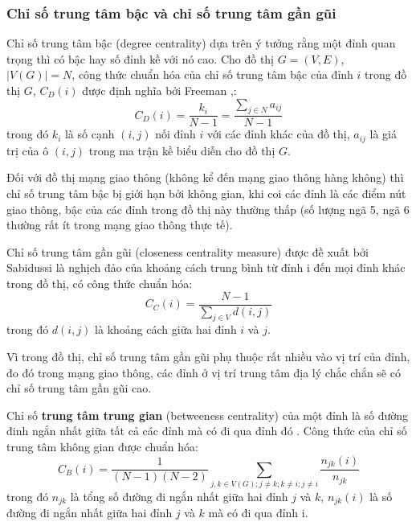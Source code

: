 \documentclass[14pt, oneside, a4paper, openany]{scrartcl}
\begin{document}

\subsubsection{Chỉ số trung tâm bậc và chỉ số trung tâm gần gũi}
Chỉ số trung tâm bậc (degree centrality) dựa trên ý tưởng rằng một đỉnh quan trọng thì có bậc hay số đỉnh kề với nó cao. Cho đồ thị $G=(V,E)$, $|V(G)| = N$, công thức chuẩn hóa của chỉ số trung tâm bậc của đỉnh $i$ trong đồ thị $G$, $C_D(i)$ được định nghĩa bởi Freeman \cite{centrali01},\cite{centrali02}:
\begin{equation}
	C_D(i) = \frac{k_i}{N-1} = \frac{\sum_{j \in N}a_{ij}}{N-1}
\end{equation}
trong đó $k_i$ là số cạnh $(i,j)$ nối đỉnh $i$ với các đỉnh khác của đồ thị, $a_{ij}$ là giá trị của ô $(i,j)$ trong ma trận kề biểu diễn cho đồ thị $G$.

Đối với đồ thị mạng giao thông (không kể đến mạng giao thông hàng không) thì chỉ số trung tâm bậc bị giới hạn bởi không gian, khi coi các đỉnh là các điểm nút giao thông, bậc của các đỉnh trong đồ thị này thường thấp (số lượng ngã 5, ngã 6 thường rất ít trong mạng giao thông thực tế).

Chỉ số trung tâm gần gũi (closeness centrality measure) được đề xuất bởi Sabidussi \cite{centrali03} là nghịch đảo của khoảng cách trung bình từ đỉnh i đến mọi đỉnh khác trong đồ thị, có công thức chuẩn hóa:
\begin{equation}
C_C(i) = \frac{N-1}{\sum_{j \in V} d(i,j)}
\end{equation}
trong đó $d(i,j)$ là khoảng cách giữa hai đỉnh $i$ và $j$.

Vì trong đồ thị, chỉ số trung tâm gần gũi phụ thuộc rất nhiều vào vị trí của đỉnh, đo đó trong mạng giao thông, các đỉnh ở vị trí trung tâm địa lý chắc chắn sẽ có chỉ số trung tâm gần gũi cao.

Chỉ số \textbf{trung tâm trung gian}  (betweeness centrality) của một đỉnh là số đường đinh ngắn nhất giữa tất cả các đỉnh mà có đi qua đỉnh đó \cite{centrali02}. Công thức của chỉ số trung tâm không gian được chuẩn hóa:
\begin{equation}
	C_B(i) = \frac{1}{(N-1)(N-2)} \sum_{j,k \in V(G); j \neq k; k\neq i; j \neq i} \frac{n_{jk}(i)}{n_{jk}}
\end{equation}
trong đó $n_{jk}$ là tổng số đường đi ngắn nhất giữa hai đỉnh $j$ và $k$, $n_{jk}(i)$ là số đường đi ngắn nhất giữa hai đỉnh $j$ và $k$ mà có đi qua đỉnh i.
\end{document}
